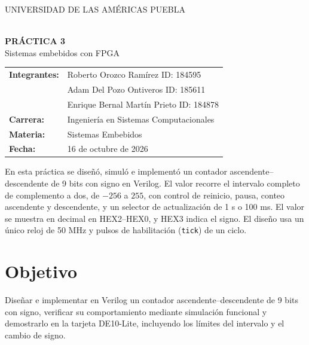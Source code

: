 \documentclass[11pt,a4paper]{article}
\newcommand{\tbox}[2]{%
  \begin{tcolorbox}[colback=fondoc,colframe=#1,title=#2,fonttitle=\bfseries,boxrule=0.6pt,arc=2pt]
}
\begin{document}
\begin{center}
  \colorbox{azul}{\parbox{0.92\textwidth}{\centering\color{white}\bfseries\large\strut UNIVERSIDAD DE LAS AM\'ERICAS PUEBLA\strut}}\\[1.2em]
  {\LARGE\bfseries\color{celeste} PR\'ACTICA 3}\\[0.3em]
  {\small Sistemas embebidos con FPGA}\\[1.2em]
\end{center}

\vspace{1.2em}

\begin{tabular}{@{}p{3.2cm}p{11.8cm}@{}}
  \textbf{Integrantes:} & Roberto Orozco Ram\'irez \quad ID: 184595\\
                        & Adam Del Pozo Ontiveros \quad ID: 185611\\
                        & Enrique Bernal Mart\'in Prieto \quad ID: 184878\\[0.4em]
  \textbf{Carrera:}     & Ingenier\'ia en Sistemas Computacionales\\
  \textbf{Materia:}     & Sistemas Embebidos\\
  \textbf{Fecha:}       & 16 de octubre de 2026\\
\end{tabular}

\vspace{0.8em}
\tbox{celeste}{Resumen}
En esta pr\'actica se dise\~n\'o, simul\'o e implement\'o un contador ascendente--descendente de 9 bits con signo en Verilog. El valor recorre el intervalo completo de complemento a dos, de $-256$ a $255$, con control de reinicio, pausa, conteo ascendente y descendente, y un selector de actualizaci\'on de 1 s o 100 ms. El valor se muestra en decimal en HEX2--HEX0, y HEX3 indica el signo. El dise\~no usa un \'unico reloj de 50 MHz y pulsos de habilitaci\'on (\texttt{tick}) de un ciclo.
\end{tcolorbox}

\section{Objetivo}
Dise\~nar e implementar en Verilog un contador ascendente--descendente de 9 bits con signo, verificar su comportamiento mediante simulaci\'on funcional y demostrarlo en la tarjeta DE10-Lite, incluyendo los l\'imites del intervalo y el cambio de signo.
\end{document}
